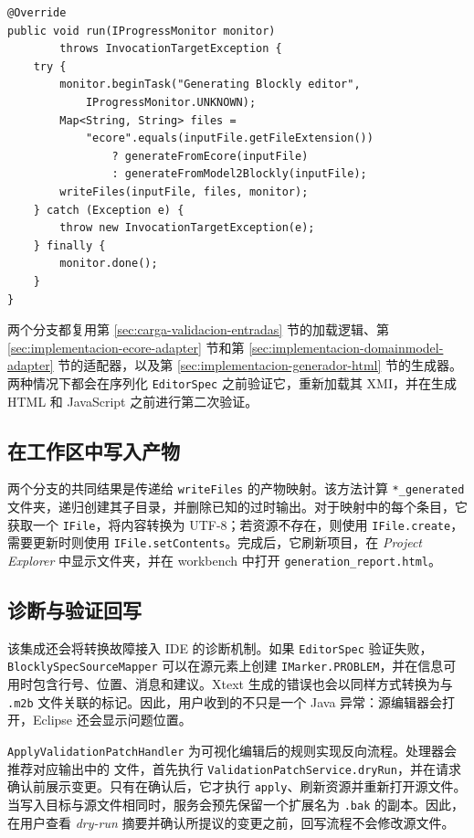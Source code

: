 \begin{lstlisting}[style=tfmjava, caption={Eclipse 生成路线的选择与执行}, label={lst:eclipse-generate-runnable}]
@Override
public void run(IProgressMonitor monitor)
        throws InvocationTargetException {
    try {
        monitor.beginTask("Generating Blockly editor",
            IProgressMonitor.UNKNOWN);
        Map<String, String> files =
            "ecore".equals(inputFile.getFileExtension())
                ? generateFromEcore(inputFile)
                : generateFromModel2Blockly(inputFile);
        writeFiles(inputFile, files, monitor);
    } catch (Exception e) {
        throw new InvocationTargetException(e);
    } finally {
        monitor.done();
    }
}
\end{lstlisting}

两个分支都复用第 \ref{sec:carga-validacion-entradas} 节的加载逻辑、第 \ref{sec:implementacion-ecore-adapter} 节和第 \ref{sec:implementacion-domainmodel-adapter} 节的适配器，以及第 \ref{sec:implementacion-generador-html} 节的生成器。两种情况下都会在序列化 \texttt{EditorSpec} 之前验证它，重新加载其 XMI，并在生成 HTML 和 JavaScript 之前进行第二次验证。

\subsection{在工作区中写入产物}

两个分支的共同结果是传递给 \texttt{writeFiles} 的产物映射。该方法计算 \texttt{*\_generated} 文件夹，递归创建其子目录，并删除已知的过时输出。对于映射中的每个条目，它获取一个 \texttt{IFile}，将内容转换为 UTF-8；若资源不存在，则使用 \texttt{IFile.create}，需要更新时则使用 \texttt{IFile.setContents}。完成后，它刷新项目，在 \emph{Project Explorer} 中显示文件夹，并在 workbench 中打开 \texttt{generation\_report.html}。

\subsection{诊断与验证回写}

该集成还会将转换故障接入 IDE 的诊断机制。如果 \texttt{EditorSpec} 验证失败，\texttt{BlocklySpecSourceMapper} 可以在源元素上创建 \texttt{IMarker.PROBLEM}，并在信息可用时包含行号、位置、消息和建议。Xtext 生成的错误也会以同样方式转换为与 \texttt{.m2b} 文件关联的标记。因此，用户收到的不只是一个 Java 异常：源编辑器会打开，Eclipse 还会显示问题位置。

\texttt{ApplyValidation}\allowbreak\texttt{PatchHandler} 为可视化编辑后的规则实现反向流程。处理器会推荐对应输出中的  文件，首先执行
\texttt{ValidationPatch}\allowbreak\texttt{Service.dryRun}，并在请求确认前展示变更。只有在确认后，它才执行 \texttt{apply}、刷新资源并重新打开源文件。当写入目标与源文件相同时，服务会预先保留一个扩展名为 \texttt{.bak} 的副本。因此，在用户查看 \emph{dry-run} 摘要并确认所提议的变更之前，回写流程不会修改源文件。

